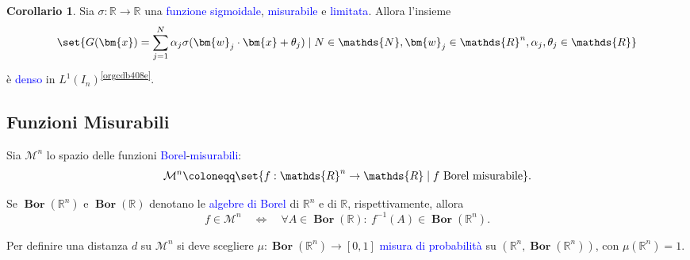 \documentclass[10pt]{book}
\newcommand{\1}{\mathds{1}}
\newcommand{\R}{\mathds{R}}
\newcommand{\N}{\mathds{N}}
\theoremstyle{definition}%
\newtheorem{cor}[thm]{Corollario}
\theoremstyle{plain}
\theoremstyle{remark}
\renewcommand{\href}[2]{\textcolor{blue}{#2}}
\begin{document}
\begin{cor}
Sia \(\sigma:\R\to\R\) una \href{../../../../../org/roam/20250202170607-classe_relazione_binaria.org}{funzione} \href{../../../../../org/roam/20250625110110-funzione_sigmoidale.org}{sigmoidale}, \href{../../../../../org/roam/20250704104947-funzione_misurabile.org}{misurabile} e \href{../../../../../org/roam/20250704145518-funzione_limitata.org}{limitata}. Allora l'insieme
\begin{equation*}
\set{
G(\bm{x}) = \sum_{j=1}^{N}\alpha_{j}\sigma(\bm{w}_{j}\cdot \bm{x} + \theta_{j})\mid N \in \N, \bm{w}_{j} \in \R^{n}, \alpha_{j},\theta_{j} \in \R
}
\end{equation*}
è \href{../../../../../org/roam/20250301193045-sottoinsieme_denso.org}{denso} in \(L^{1}(I_{n})\)\textsuperscript{\ref{orgcdb408e}}.
\label{thm9.3.18}
\end{cor}
\subsection{Funzioni Misurabili}
\label{sec:org0695f6c}

Sia \(\mathcal{M}^{n}\) lo spazio delle funzioni \href{../../../../../org/roam/20250704104938-algebra_di_borel.org}{Borel}-\href{../../../../../org/roam/20250704104947-funzione_misurabile.org}{misurabili}:
\begin{equation*}
\mathcal{M}^{n}\coloneqq \set{f:\R^{n}\to \R\mid f\text{ Borel misurabile}}.
\end{equation*}

Se \(\bm{{\operatorname{Bor}}}(\R^{n})\) e \(\bm{{\operatorname{Bor}}}(\R)\) denotano le \href{../../../../../org/roam/20250704104938-algebra_di_borel.org}{algebre di Borel} di \(\R^{n}\) e di \(\R\), rispettivamente, allora
\begin{equation*}
f \in \mathcal{M}^{n}\quad \iff\quad \forall A \in \bm{{\operatorname{Bor}}}(\R): \ f^{-1}(A) \in \bm{{\operatorname{Bor}}}(\R^{n}).
\end{equation*}

Per definire una distanza \(d\) su \(\mathcal{M}^{n}\) si deve scegliere \(\mu:\bm{{\operatorname{Bor}}}(\R^{n})\to [0,1]\) \href{../../../../../org/roam/20250704105515-misura_di_probabilita.org}{misura di probabilità} su \(\left(\R^{n}, \bm{{\operatorname{Bor}}}(\R^{n})\right)\), con \(\mu(\R^{n})=1\).
\end{document}
